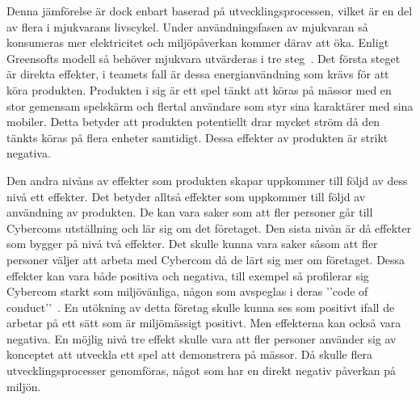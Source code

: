 Denna jämförelse är dock enbart baserad på utvecklingsprocessen, vilket är en del av flera i mjukvarans livscykel. Under användningsfasen av mjukvaran så konsumeras mer elektricitet och miljöpåverkan kommer därav att öka. Enligt Greensofts modell så behöver mjukvara utvärderas i tre steg~\cite{greensoft}. Det första steget är direkta effekter, i teamets fall är dessa energianvändning som krävs för att köra produkten. Produkten i sig är ett spel tänkt att köras på mässor med en stor gemensam spelskärm och flertal användare som styr sina karaktärer med sina mobiler. Detta betyder att produkten potentiellt drar mycket ström då den tänkts köras på flera enheter samtidigt. Dessa effekter av produkten är strikt negativa.

Den andra nivåns av effekter som produkten skapar uppkommer till följd av dess nivå ett effekter. Det betyder alltså effekter som uppkommer till följd av användning av produkten. De kan vara saker som att fler personer går till Cybercoms utställning och lär sig om det företaget. Den sista nivån är då effekter som bygger på nivå två effekter. Det skulle kunna vara saker såsom att fler personer väljer att arbeta med Cybercom då de lärt sig mer om företaget. Dessa effekter kan vara både positiva och negativa, till exempel så profilerar sig Cybercom starkt som miljövänliga, någon som avspeglas i deras ’’code of conduct’’~\cite{cyber-cod}. En utökning av detta företag skulle kunna ses som positivt ifall de arbetar på ett sätt som är miljömässigt positivt. Men effekterna kan också vara negativa. En möjlig nivå tre effekt skulle vara att fler personer använder sig av konceptet att utveckla ett spel att demonstrera på mässor. Då skulle flera utvecklingsprocesser genomföras, något som har en direkt negativ påverkan på miljön.